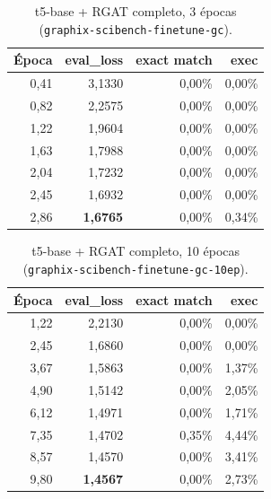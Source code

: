 \documentclass{article}
\begin{document}
\begin{table}[h]
\centering
\caption{t5-base + RGAT completo, 3 épocas (\texttt{graphix-scibench-finetune-gc}).}
\begin{tabular}{rrrr}
\toprule
\textbf{Época} & \textbf{eval\_loss} & \textbf{exact match} & \textbf{exec} \\
\midrule
0,41 & 3,1330 & 0,00\% & 0,00\% \\
0,82 & 2,2575 & 0,00\% & 0,00\% \\
1,22 & 1,9604 & 0,00\% & 0,00\% \\
1,63 & 1,7988 & 0,00\% & 0,00\% \\
2,04 & 1,7232 & 0,00\% & 0,00\% \\
2,45 & 1,6932 & 0,00\% & 0,00\% \\
2,86 & \textbf{1,6765} & 0,00\% & 0,34\% \\
\bottomrule
\end{tabular}
\end{table}

\begin{table}[h]
\centering
\caption{t5-base + RGAT completo, 10 épocas (\texttt{graphix-scibench-finetune-gc-10ep}).}
\begin{tabular}{rrrr}
\toprule
\textbf{Época} & \textbf{eval\_loss} & \textbf{exact match} & \textbf{exec} \\
\midrule
1,22 & 2,2130 & 0,00\% & 0,00\% \\
2,45 & 1,6860 & 0,00\% & 0,00\% \\
3,67 & 1,5863 & 0,00\% & 1,37\% \\
4,90 & 1,5142 & 0,00\% & 2,05\% \\
6,12 & 1,4971 & 0,00\% & 1,71\% \\
7,35 & 1,4702 & 0,35\% & 4,44\% \\
8,57 & 1,4570 & 0,00\% & 3,41\% \\
9,80 & \textbf{1,4567} & 0,00\% & 2,73\% \\
\bottomrule
\end{tabular}
\end{table}
\end{document}
